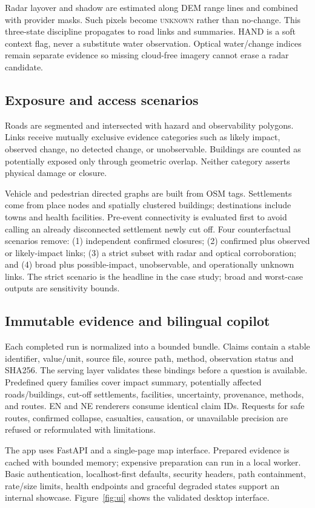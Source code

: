 \documentclass[10pt,twocolumn,letterpaper]{article}
\newcommand{\unknown}{\textsc{unknown}\xspace}
\begin{document}
Radar layover and shadow are estimated along DEM range lines and combined with
provider masks. Such pixels become \unknown rather than no-change. This
three-state discipline propagates to road links and summaries. HAND is a soft
context flag, never a substitute water observation. Optical water/change indices
remain separate evidence so missing cloud-free imagery cannot erase a radar
candidate.

\subsection{Exposure and access scenarios}
Roads are segmented and intersected with hazard and observability polygons.
Links receive mutually exclusive evidence categories such as likely impact,
observed change, no detected change, or unobservable. Buildings are counted as
potentially exposed only through geometric overlap. Neither category asserts
physical damage or closure.

Vehicle and pedestrian directed graphs are built from OSM tags. Settlements come
from place nodes and spatially clustered buildings; destinations include towns
and health facilities. Pre-event connectivity is evaluated first to avoid
calling an already disconnected settlement newly cut off. Four counterfactual
scenarios remove: (1) independent confirmed closures; (2) confirmed plus observed
or likely-impact links; (3) a strict subset with radar and optical corroboration;
and (4) broad plus possible-impact, unobservable, and operationally unknown
links. The strict scenario is the headline in the case study; broad and
worst-case outputs are sensitivity bounds.

\subsection{Immutable evidence and bilingual copilot}
Each completed run is normalized into a bounded bundle. Claims contain a stable
identifier, value/unit, source file, source path, method, observation status and
SHA256. The serving layer validates these bindings before a question is
available. Predefined query families cover impact summary, potentially affected
roads/buildings, cut-off settlements, facilities, uncertainty, provenance,
methods, and routes. EN and NE renderers consume identical claim IDs. Requests
for safe routes, confirmed collapse, casualties, causation, or unavailable
precision are refused or reformulated with limitations.

The app uses FastAPI and a single-page map interface. Prepared evidence is
cached with bounded memory; expensive preparation can run in a local worker.
Basic authentication, localhost-first defaults, security headers, path
containment, rate/size limits, health endpoints and graceful degraded states
support an internal showcase. Figure~\ref{fig:ui} shows the validated desktop
interface.
\end{document}
